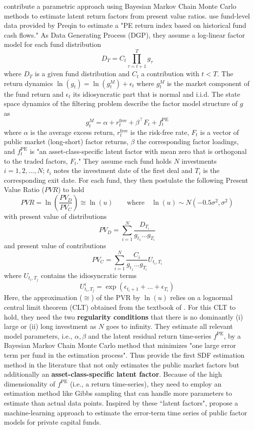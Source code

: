 \documentclass[12pt]{article}
\begin{document}
\cite{ACGP18} contribute a parametric approach using Bayesian Markov Chain Monte Carlo methods to estimate latent return factors from present value ratios.
\cite{ACGP18} use fund-level data provided by Preqin to estimate a "PE return index based on historical fund cash flows."
As Data Generating Process (DGP), they assume a log-linear factor model for each fund distribution
\begin{equation}
	\label{eq:data_generating_process}
	D_T = C_t \prod_{\tau=t+1}^{T} g_{\tau}
\end{equation}
where $D_T$ is a given fund distribution and $C_t$ a contribution with $t<T$.
The return dynamics $\ln (g_t) = \ln (g_t^M) + \epsilon_t$ where $g_t^M$ is the market component of the fund return and $\epsilon_t$ its idiosyncratic part that is normal and i.i.d.
The state space dynamics of the filtering problem describe the factor model structure of $g$ as
\[
g_t^M = \alpha + r_t^{\mathrm{free}} + \beta^{\top} F_t + f_t^{\mathrm{PE}}
\]
where $\alpha$ is the average excess return, $r_t^{\mathrm{free}}$ is the risk-free rate, $F_t$ is a vector of public market (long-short) factor returns, $\beta$ the corresponding factor loadings, and $f_t^{\mathrm{PE}}$ is "an asset-class-specific latent factor with mean zero that is orthogonal to the traded factors, $F_t$."
They assume each fund holds $N$ investments $i=1,2,\dots,N$; $t_i$ notes the investment date of the first deal and $T_i$ is the corresponding exit date.
For each fund, they then postulate the following Present Value Ratio ($PVR$) to hold
\begin{equation}
	\label{eq:pvr_ang_2018}
	PVR = \ln \left(\frac{PV_D}{PV_C}\right) \cong \ln (u) \qquad \mathrm{where} \quad \ln (u) \sim N \left( - 0.5 \sigma^2, \sigma^2 \right)
\end{equation}
with present value of distributions
\[
PV_D = \sum_{i=1}^N \frac{D_{T_i}}{g_{t_1} \dots g_{T_i}}
\]
and present value of contributions
\[
PV_C = \sum_{i=1}^N \frac{C_{i}}{g_{t_1} \dots g_{T_i}} U_{t_i, T_i}
\]
where $U_{t_i, T_j}$ contains the idiosyncratic terms
\[
U_{t_i, T_j}^i = \exp \left( \epsilon_{t_i + 1} + \dots + \epsilon_{T_i} \right)
\]
Here, the approximation ($\cong$) of the PVR by $\ln (u)$ relies on a lognormal central limit theorem (CLT) obtained from the textbook of \cite{BT13}.
For this CLT to hold, they need the two \textbf{regularity conditions} that there is no dominantly (i) large or (ii) long investment as $N$ goes to infinity.
They estimate all relevant model parameters, i.e., $\alpha,\beta$ and the latent residual return time-series $f^{\mathrm{PE}}$, by a Bayesian Markov Chain Monte Carlo method that minimizes "one large error term per fund in the estimation process".
Thus \cite{ACGP18} provide the first SDF estimation method in the literature that not only estimates the public market factors but additionally an \textbf{asset-class-specific latent factor}.
Because of the high dimensionality of $f^{\mathrm{PE}}$ (i.e., a return time-series), they need to employ an estimation method like Gibbs sampling that can handle more parameters to estimate than actual data points.
Inspired by these ``latent factors", \cite{TP24} propose a machine-learning approach to estimate the error-term time series of public factor models for private capital funds.
\end{document}

